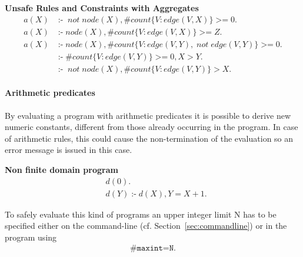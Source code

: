 \documentclass[a4paper, titlepage]{article}
\DeclareMathOperator{\leftimpl}{:-}
\DeclareMathOperator{\nott}{\mathit{not}}
\DeclareMathOperator{\geeq}{>=}
\begin{document}
\begin{exmp} \textbf{Unsafe Rules and Constraints with Aggregates}
\begin{align*}
a(X) & \leftimpl \nott node(X), \#count\{V \colon edge(V,X)\} \geeq 0. \\
a(X) & \leftimpl node(X), \#count\{V \colon edge(V,X)\} \geeq Z. \\
a(X) & \leftimpl node(X), \#count\{V \colon edge(V,Y), \nott edge(V,Y)\} \geeq 0. \\
& \leftimpl \#count\{ V \colon edge(V,Y)\} \geeq 0, X > Y. \\
& \leftimpl \nott node(X), \#count\{V \colon edge(V,Y)\} > X. 
\end{align*}
\end{exmp}

\paragraph{Arithmetic predicates}
By evaluating a program with arithmetic predicates it is possible to derive new numeric constants, different from those already occurring in the program. In case of arithmetic rules, this could cause the non-termination of the evaluation so an error message is issued in this case.
\begin{exmp} \textbf{Non finite domain program}
\begin{align*}
& d(0). \\
& d(Y) \leftimpl d(X), Y=X+1.
\end{align*}
\end{exmp}
To safely evaluate this kind of programs an upper integer limit N has to be specified either on the command-line (cf. Section~\ref{sec:commandline}) or in the program using
\begin{align*}
  \texttt{\#maxint=N.}
\end{align*}
\end{document}
